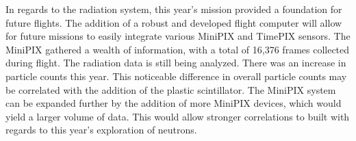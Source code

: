 In regards to the radiation system, this year's mission provided a foundation for future flights.  The addition of a robust and developed flight computer will allow for future missions to easily integrate various MiniPIX and TimePIX sensors.  The MiniPIX gathered a wealth of information, with a total of 16,376 frames collected during flight.  The radiation data is still being analyzed. There was an increase in particle counts this year.  This noticeable difference in overall particle counts may be correlated with the addition of the plastic scintillator. The MiniPIX system can be expanded further by the addition of more MiniPIX devices, which would yield a larger volume of data. This would allow stronger correlations to built with regards to this year's exploration of neutrons.
%
%

